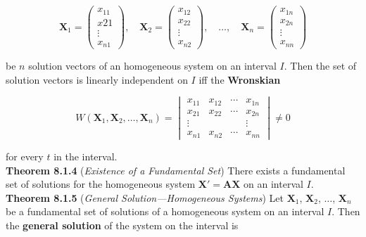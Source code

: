 \documentclass[12pt]{article}
\begin{document}
\begin{equation}
    \mathbf{X}_1 = \begin{pmatrix}
        x_{11}\\
        x{21}\\
        \vdots\\
        x_{n1}
    \end{pmatrix}, \quad
    \mathbf{X}_2 = \begin{pmatrix}
        x_{12}\\
        x_{22}\\
        \vdots\\
        x_{n2}
    \end{pmatrix}, \quad \ldots, \quad
    \mathbf{X}_n = \begin{pmatrix}
        x_{1n}\\
        x_{2n}\\
        \vdots\\
        x_{nn}
    \end{pmatrix}
\end{equation}

\noindent be \(n\) solution vectors of an homogeneous system on an interval \(I\). Then the set of solution vectors is linearly independent on \(I\) iff the \textbf{Wronskian}

\begin{equation}
    W(\mathbf{X}_1, \mathbf{X}_2, \ldots, \mathbf{X}_n) = \begin{vmatrix}
        x_{11} & x_{12} & \cdots & x_{1n}\\
        x_{21} & x_{22} & \cdots & x_{2n}\\
        \vdots & & & \vdots\\
        x_{n1} & x_{n2} & \cdots & x_{nn} 
    \end{vmatrix} \neq 0
\end{equation}

\noindent for every \(t\) in the interval.\\

\noindent\textbf{Theorem 8.1.4} (\emph{Existence of a Fundamental Set}) There exists a fundamental set of solutions for the homogeneous system \(\mathbf{X'} = \mathbf{AX}\) on an interval \(I\).\\

\noindent\textbf{Theorem 8.1.5} (\emph{General Solution—Homogeneous Systems}) Let \(\mathbf{X}_1\), \(\mathbf{X}_2\), \(\ldots\), \(\mathbf{X}_n\) be a fundamental set of solutions of a homogeneous system on an interval \(I\). Then the \textbf{general solution} of the system on the interval is
\end{document}
